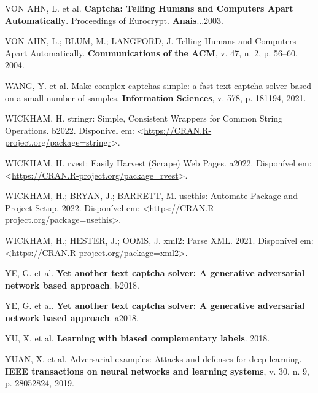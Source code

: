 \documentclass[12pt,twoside,brazilian]{book}
\newlength{\cslhangindent}
\newlength{\cslentryspacingunit} %
\newenvironment{CSLReferences}[2] %
 {%
  \setlength{\parindent}{0pt}
  \ifodd #1
  \let\oldpar\par
  \def\par{\hangindent=\cslhangindent\oldpar}
  \fi
  \setlength{\parskip}{#2\cslentryspacingunit}
 }%
 {}
\begin{document}
\begin{CSLReferences}{0}{1}
\leavevmode{}%
VON AHN, L. et al. \textbf{Captcha: {Telling} Humans and Computers Apart
Automatically}. Proceedings of Eurocrypt. \textbf{Anais}...2003.

\leavevmode{}%
VON AHN, L.; BLUM, M.; LANGFORD, J. Telling Humans and Computers Apart
Automatically. \textbf{Communications of the ACM}, v. 47, n. 2, p.
56--60, 2004.

\leavevmode{}%
WANG, Y. et al. Make complex captchas simple: a fast text captcha solver
based on a small number of samples. \textbf{Information Sciences}, v.
578, p. 181194, 2021.

\leavevmode{}%
WICKHAM, H. stringr: Simple, Consistent Wrappers for Common String
Operations. b2022. Disponível em:
\textless{}\url{https://CRAN.R-project.org/package=stringr}\textgreater.

\leavevmode{}%
WICKHAM, H. rvest: Easily Harvest (Scrape) Web Pages. a2022. Disponível
em:
\textless{}\url{https://CRAN.R-project.org/package=rvest}\textgreater.

\leavevmode{}%
WICKHAM, H.; BRYAN, J.; BARRETT, M. usethis: Automate Package and
Project Setup. 2022. Disponível em:
\textless{}\url{https://CRAN.R-project.org/package=usethis}\textgreater.

\leavevmode{}%
WICKHAM, H.; HESTER, J.; OOMS, J. xml2: Parse XML. 2021. Disponível em:
\textless{}\url{https://CRAN.R-project.org/package=xml2}\textgreater.

\leavevmode{}%
YE, G. et al. \textbf{Yet another text captcha solver: A generative
adversarial network based approach}. b2018.

\leavevmode{}%
YE, G. et al. \textbf{Yet another text captcha solver: A generative
adversarial network based approach}. a2018.

\leavevmode{}%
YU, X. et al. \textbf{Learning with biased complementary labels}. 2018.

\leavevmode{}%
YUAN, X. et al. Adversarial examples: Attacks and defenses for deep
learning. \textbf{IEEE transactions on neural networks and learning
systems}, v. 30, n. 9, p. 28052824, 2019.


\end{CSLReferences}
\end{document}

